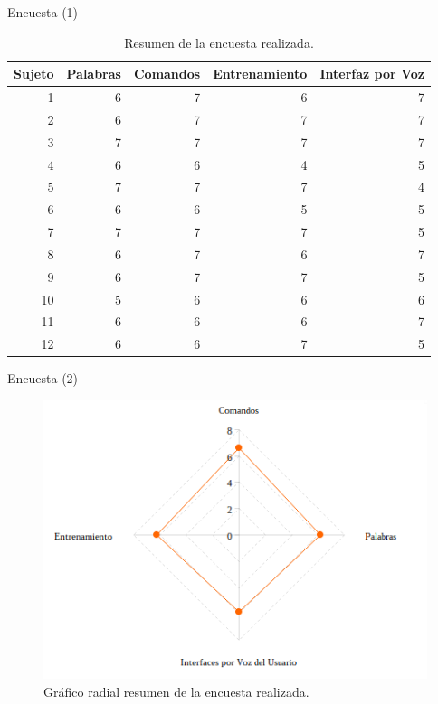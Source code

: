 \begin{frame}{Encuesta (1)}
\begin{table}[H] 
\centering
\footnotesize
\begin{tabular}{|r|r|r|r|r|}
\hline
    Sujeto & Palabras & Comandos & Entrenamiento & Interfaz por Voz \\
    \hline
    1 & 6 & 7 & 6 & 7 \\
    2 & 6 & 7 & 7 & 7 \\
    3 & 7 & 7 & 7 & 7 \\
    4 & 6 & 6 & 4 & 5 \\
    5 & 7 & 7 & 7 & 4 \\
    6 & 6 & 6 & 5 & 5 \\
    7 & 7 & 7 & 7 & 5 \\
    8 & 6 & 7 & 6 & 7  \\
    9 & 6 & 7 & 7 & 5  \\
    10 & 5 & 6 & 6 & 6  \\
    11 & 6 & 6 & 6 & 7  \\
    12 & 6 & 6 & 7 & 5  \\
\hline
\end{tabular}
\caption{Resumen de la encuesta realizada.}
\label{sec:tabla-encuesta}
\end{table}

\end{frame}


\begin{frame}{Encuesta (2)}
\begin{figure}[ht]
\centering
\includegraphics[width=0.6\linewidth]{./graphics/kiviat0.png}
\caption{Gr\'afico radial resumen de la encuesta realizada.}
\label{figure:kiviat-encuesta1}
\end{figure}
\end{frame}

